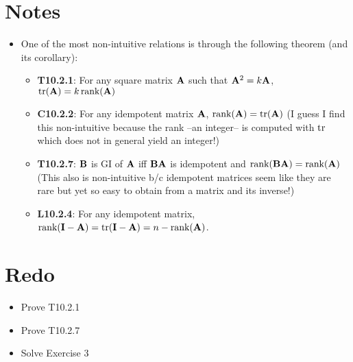 \documentclass[a4paper, oneside]{book}
\begin{document}
\section*{Notes}
\begin{itemize}
\item One of the most non-intuitive relations is through the following theorem (and its corollary):
	\begin{itemize}
	\item \textbf{T10.2.1}: For any square matrix $\mathbf A$ such that $\mathbf A^2=k \mathbf A$, $\text{tr}(\mathbf A) = k\, \text{rank}(\mathbf A)$
	\item \textbf{C10.2.2}: For any idempotent matrix $\mathbf A$, $\text{rank}(\mathbf A) = \text{tr}(\mathbf A)$ (I guess I find this non-intuitive because the rank \---an integer\--- is computed with $\text{tr}$ which does not in general yield an integer!)
	\item \textbf{T10.2.7}: $\mathbf B$ is GI of $\mathbf A$ iff $\mathbf{BA}$ is idempotent and $\text{rank}(\mathbf {BA}) = \text{rank}(\mathbf A)$ (This also is non-intuitive b/c idempotent matrices seem like they are rare but yet so easy to obtain from a matrix and its inverse!)
	\item \textbf{L10.2.4}: For any idempotent matrix, $\text{rank}(\mathbf{I-A})=\text{tr}(\mathbf{I-A})=n-\text{rank}(\mathbf{A})$.
	\end{itemize}
\end{itemize}


\section*{Redo}
\begin{itemize}
\item Prove T10.2.1
\item Prove T10.2.7
\item Solve Exercise 3
\end{itemize}












\end{document}
